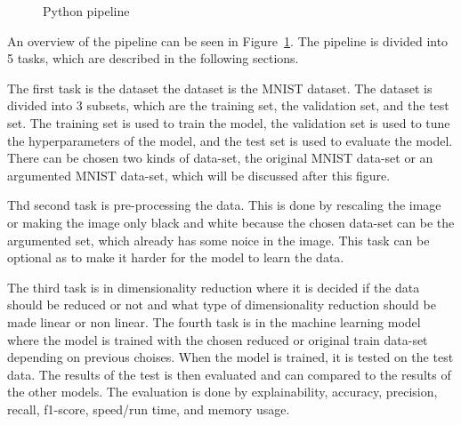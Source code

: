 \begin{figure}[htb!]
    \caption{Python pipeline}
    \label{fig:Python-pipeline}
\end{figure}

An overview of the pipeline can be seen in Figure~\ref{fig:Python-pipeline}. The pipeline is divided into 5 tasks, which are described in the following sections. 

The first task is the dataset the dataset is the MNIST dataset. The dataset is divided into 3 subsets, which are the training set, the validation set, and the test set. The training set is used to train the model, the validation set is used to tune the hyperparameters of the model, and the test set is used to evaluate the model. There can be chosen two kinds of data-set, the original MNIST data-set or an argumented MNIST data-set, which will be discussed after this figure. 

Thd second task is pre-processing the data. This is done by rescaling the image or making the image only black and white because the chosen data-set can be the argumented set, which already has some noice in the image. This task can be optional as to make it harder for the model to learn the data.

The third task is in dimensionality reduction where it is decided if the data should be reduced or not and what type of dimensionality reduction should be made linear or non linear. The fourth task is in the machine learning model where the model is trained with the chosen reduced or original train data-set depending on previous choises. When the model is trained, it is tested on the test data. The results of the test is then evaluated and can compared to the results of the other models. The evaluation is done by explainability, accuracy, precision, recall, f1-score, speed/run time, and memory usage.


